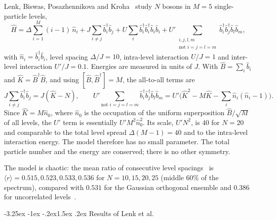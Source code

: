 \documentclass[10pt,a4paper]{article}
\makeatletter
\renewcommand{\subsection}{\@startsection{subsection}{2}{\z@}%
  {-3.25ex \@plus -1ex \@minus -.2ex}{1.5ex \@plus .2ex}%
  {\normalfont\fontsize{15.5pt}{19pt}\selectfont\bfseries}}
\makeatother
\begin{document}
Lenk, Biswas, Posazhennikova and Kroha~\cite{Lenk2025} study $ N $ bosons in $ M = 5 $ single-particle levels,
\begin{equation}
  \hat H = \Delta \sum_{i=1}^{M} (i-1) \, \hat n_i
  + J \sum_{i \neq j} \hat b_i^\dagger \hat b_j
  + U \sum_i \hat b_i^\dagger \hat b_i^\dagger \hat b_i \hat b_i
  + U' \!\!\! \sum_{\substack{i,j,l,m \\ \text{not } i=j=l=m}} \!\!\! \hat b_i^\dagger \hat b_j^\dagger \hat b_l \hat b_m ,
  \label{eq:lenk-H}
\end{equation}
with $ \hat n_i = \hat b_i^\dagger \hat b_i $, level spacing $ \Delta/J = 10 $, intra-level interaction $ U/J = 1 $ and inter-level interaction $ U'/J = 0.1 $.
Energies are measured in units of $ J $.
With $ \hat B = \sum_i \hat b_i $ and $ \hat K = \hat B^\dagger \hat B $, and using $ [\hat B, \hat B^\dagger] = M $, the all-to-all terms are
\begin{equation}
  J \sum_{i\neq j} \hat b_i^\dagger \hat b_j = J (\hat K - N) ,
  \qquad
  U' \!\!\! \sum_{\text{not } i=j=l=m} \!\!\! \hat b_i^\dagger \hat b_j^\dagger \hat b_l \hat b_m = U' \Big( \hat K^2 - M\hat K - \sum_i \hat n_i(\hat n_i - 1) \Big) .
  \label{eq:lenk-K}
\end{equation}
Since $ \hat K = M \hat n_0 $, where $ \hat n_0 $ is the occupation of the uniform superposition $ \hat B/\sqrt M $ of all levels, the $ U' $ term is essentially $ U' M^2 \hat n_0^2 $.
Its scale, $ U' N^2 $, is $ 40 $ for $ N = 20 $ and comparable to the total level spread $ \Delta(M-1) = 40 $ and to the intra-level interaction energy.
The model therefore has no small parameter.
The total particle number and the energy are conserved; there is no other symmetry.

The model is chaotic: the mean ratio of consecutive level spacings~\cite{Oganesyan2007} is $ \langle r\rangle = 0.515, 0.523, 0.533, 0.536 $ for $ N = 10, 15, 20, 25 $ (middle 60\% of the spectrum), compared with $ 0.531 $ for the Gaussian orthogonal ensemble and $ 0.386 $ for uncorrelated levels~\cite{Atas2013}.

\subsection{Results of Lenk et al.}
\label{sec:lenk-results}
\end{document}
